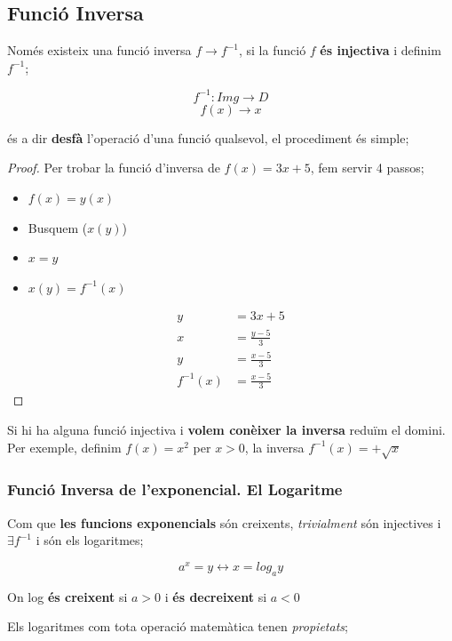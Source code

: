 \documentclass[12pt]{article}
\begin{document}
\subsection{Funció Inversa}

Només existeix una funció inversa $f\rightarrow f^{-1}$, si la funció $f$ \textbf{és injectiva} i definim $f^{-1}$;

\[f^{-1}: Img \rightarrow D\]
\[f(x) \rightarrow x\]

és a dir \textbf{desfà} l'operació d'una funció qualsevol, el procediment és simple;

\begin{proof}
    Per trobar la funció d'inversa de $f(x) = 3x + 5$, fem servir 4 passos;

    \begin{itemize}
        \item $f(x) = y(x)$
        \item Busquem ($x(y)$)
        \item $x=y$
        \item $x(y) = f^{-1}(x)$
    \end{itemize}

    \begin{align*}
        y &= 3x + 5\\
        x &= \frac{y-5}{3}\\
        y &= \frac{x-5}{3}\\
        f^{-1}(x) &= \frac{x-5}{3}  
    \end{align*}
\end{proof}

Si hi ha alguna funció injectiva i \textbf{volem conèixer la inversa} reduïm el domini. Per exemple, definim $f(x)=x^2$ per $x>0$, la inversa $f^{-1}(x) = + \sqrt{x}$

\subsubsection{Funció Inversa de l'exponencial. El Logaritme}

Com que \textbf{les funcions exponencials} són creixents, \textit{trivialment} són injectives i $\exists f^{-1}$ i són els logaritmes;

\[a^x = y \leftrightarrow x = log_ay\]

On log \textbf{és creixent} si $a > 0$ i \textbf{és decreixent} si $a < 0$

Els logaritmes com tota operació matemàtica tenen \textit{propietats};
\end{document}
